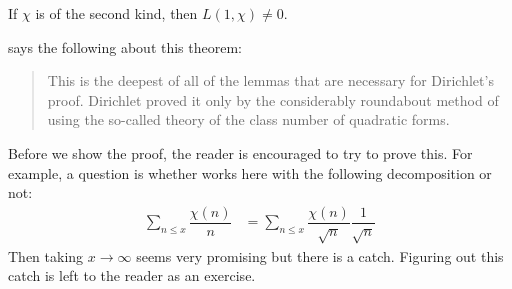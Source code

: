 \documentclass[elemannt.tex]{subfile}
\begin{document}
		\begin{proposition}
			If $\chi$ is of the second kind, then $L(1,\chi)\neq0$.
		\end{proposition}
	\textcite[pp. 122, Theorem 152]{landau_1969} says the following about this theorem:
		\begin{quote}
			This is the deepest of all of the lemmas that are necessary for Dirichlet's proof. Dirichlet proved it only by the considerably roundabout method of using the so-called theory of the class number of quadratic forms.
		\end{quote}
	Before we show the proof, the reader is encouraged to try to prove this. For example, a question is whether  works here with the following decomposition or not:
		\begin{align*}
			\sum_{n\leq x}\dfrac{\chi(n)}{n}
				& = \sum_{n\leq x}\dfrac{\chi(n)}{\sqrt{n}}\dfrac{1}{\sqrt{n}}
		\end{align*}
	Then taking $x\to\infty$ seems very promising but there is a catch. Figuring out this catch is left to the reader as an exercise.
\end{document}
